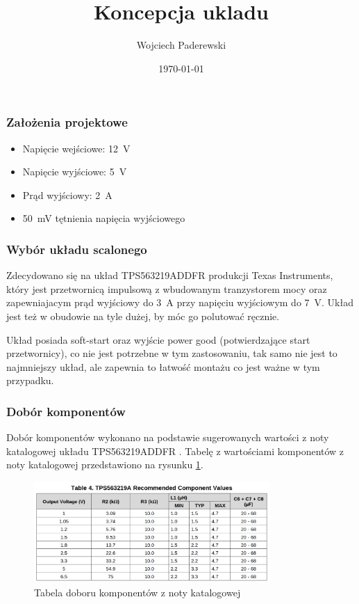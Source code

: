 \documentclass[../../main.tex]{subfiles}
\author{Wojciech Paderewski}
\date{\today}
\title{Koncepcja ukladu}
\begin{document}
 \subsubsection{Założenia projektowe}
 \begin{itemize}
     \item Napięcie wejściowe: \SI{12}{\volt}
     \item Napięcie wyjściowe: \SI{5}{\volt}
     \item Prąd wyjściowy: \SI{2}{\ampere}
     \item \SI{50}{\milli\volt} tętnienia napięcia wyjściowego
 \end{itemize}

\subsubsection{Wybór układu scalonego}
Zdecydowano się na układ TPS563219ADDFR produkcji Texas Instruments, który jest przetwornicą impulsową z wbudowanym tranzystorem mocy oraz zapewniajacym prąd wyjściowy do \SI{3}{\ampere} przy 
napięciu wyjściowym do \SI{7}{\volt}. Układ jest też w obudowie na tyle dużej, by móc go polutować ręcznie. 

Układ posiada soft-start oraz wyjście power good (potwierdzające start przetwornicy), co nie jest potrzebne w tym zastosowaniu, tak samo 
nie jest to najmniejszy układ, ale zapewnia to łatwość montażu co jest ważne w tym przypadku.
\subsubsection{Dobór komponentów}
Dobór komponentów wykonano na podstawie sugerowanych wartości z noty katalogowej układu TPS563219ADDFR \cite{st:buck}. Tabelę z wartościami komponentów z noty katalogowej 
przedstawiono na rysunku \ref{fig:conv-table}.

\begin{figure}[H]
    \centering
    \includegraphics[width=0.8\textwidth]{conv-table.png}
    \caption{Tabela doboru komponentów z noty katalogowej \cite{st:buck}}
    \label{fig:conv-table}
\end{figure}
\end{document}
